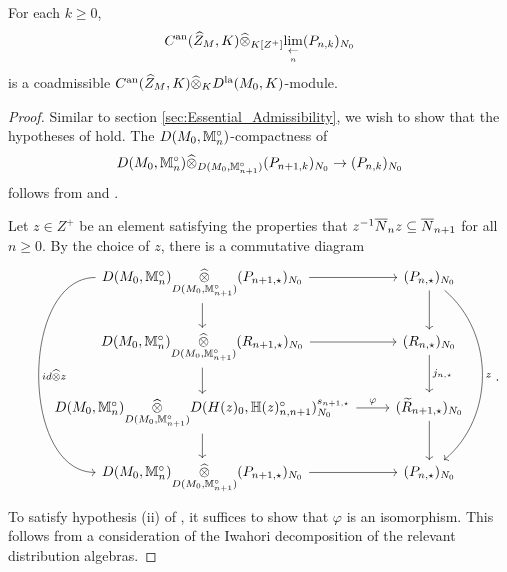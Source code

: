 \documentclass[10pt]{amsart}
\begin{document}
\begin{lemma}
For each $k\geq 0$, \[
    C^{\textnormal{an}}(\widehat{Z}_{M},K)\widehat{\otimes}_{K[Z^{+}]}\underset{\underset{n}{\leftarrow}}{\lim}(P_{n,k})_{N_{0}} 
\] is a coadmissible $C^{\textnormal{an}}(\widehat{Z}_{M},K)\widehat{\otimes}_{K}D^{\textnormal{la}}(M_{0},K)$-module. 
\end{lemma}
\begin{proof}
Similar to section \ref{sec:Essential_Admissibility}, we wish to show that the hypotheses of \cite[Prop. 3.2.24]{Jacquet1} hold. The $D(M_{0},\mathbb{M}_{n}^{\circ})$-compactness of \[
    D(M_{0},\mathbb{M}_{n}^{\circ}) \widehat{\otimes}_{D(M_{0},\mathbb{M}_{n+1}^{\circ})} (P_{n+1,k})_{N_{0}} \rightarrow (P_{n,k})_{N_{0}}
\] follows from \cite[Lem. 2.3.4]{Jacquet1} and \cite[Prop. 4.2.22]{Jacquet1}. 

Let $z\in Z^{+}$ be an element satisfying the properties that $z^{-1}\overline{N}_{n}z\subseteq \overline{N}_{n+1}$ for all $n\geq 0$. By the choice of $z$, there is a commutative diagram \begin{equation}
    \begin{tikzcd}
        D(M_{0},\m_{n}^{\circ})\underset{D(M_{0},\m_{n+1}^{\circ})}{\widehat{\otimes}}(P_{n+1,\star})_{N_{0}} \arrow[r] \arrow[d] \arrow[ddd, bend right = 90, "id\widehat{\otimes} z"] & (P_{n,\star})_{N_{0}} \arrow[d] \arrow[ddd, bend left = 50, "z"] \\
        D(M_{0},\m_{n}^{\circ})\underset{D(M_{0},\m_{n+1}^{\circ})}{\widehat{\otimes}}(R_{n+1,\star})_{N_{0}} \arrow[r]  \arrow[d] &   (R_{n,\star})_{N_{0}} \arrow[d,"j_{n,\star}"] \\
        D(M_{0},\m_{n}^{\circ})\underset{D(M_{0},\m_{n+1}^{\circ})}{\widehat{\otimes}} D(H(z)_{0},\h(z)_{n,n+1}^{\circ})_{N_{0}}^{s_{n+1,\star}} \arrow[d] \arrow[r,"\varphi"] & (\widetilde{R}_{n+1,\star})_{N_{0}} \arrow[d] \\
	    D(M_{0},\m_{n}^{\circ})\underset{D(M_{0},\m_{n+1}^{\circ})}{\widehat{\otimes}} (P_{n+1,\star})_{N_{0}} \arrow[r]  & (P_{n,\star})_{N_{0}}
    \end{tikzcd}.
\end{equation}
To satisfy hypothesis (ii) of \cite[Prop. 3.2.24]{Jacquet1}, it suffices to show that $\varphi$ is an isomorphism. This follows from a consideration of the Iwahori decomposition of the relevant distribution algebras. 
\end{proof}

\end{document}

